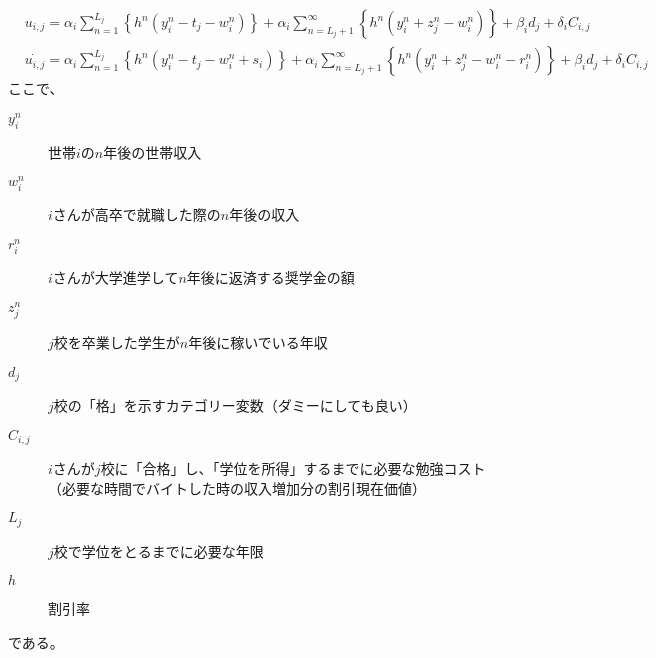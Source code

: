 \documentclass{jsarticle}
\begin{document}
	\begin{align}
		&u_{i, j} = \alpha_i \sum_{n = 1}^{L_j} \left\{ h^n (y_i^n - t_j - w_i^n) \right\} + \alpha_i \sum_{n = L_j + 1}^{\infty} \left\{ h^n (y_i^n + z_j^n - w_i^n) \right\} + \beta_i d_j + \delta_i C_{i, j} \\
		&\dot{u_{i, j}} = \alpha_i \sum_{n = 1}^{L_j} \left\{ h^n (y_i^n - t_j - w_i^n + s_i) \right\} + \alpha_i \sum_{n = L_j + 1}^{\infty} \left\{ h^n (y_i^n + z_j^n - w_i^n - r_i^n) \right\} + \beta_i d_j + \delta_i C_{i, j} 
	\end{align}
	ここで、
	\begin{description}
		\item[$y_i^n$] 世帯$i$の$n$年後の世帯収入
		\item[$w_i^n$] $i$さんが高卒で就職した際の$n$年後の収入
		\item[$r_i^n$] $i$さんが大学進学して$n$年後に返済する奨学金の額
		\item[$z_j^n$] $j$校を卒業した学生が$n$年後に稼いでいる年収
		\item[$d_j$] $j$校の「格」を示すカテゴリー変数（ダミーにしても良い）
		\item[$C_{i, j}$] $i$さんが$j$校に「合格」し、「学位を所得」するまでに必要な勉強コスト（必要な時間でバイトした時の収入増加分の割引現在価値）
		\item[$L_j$] $j$校で学位をとるまでに必要な年限
		\item[$h$] 割引率
	\end{description}
	である。
\end{document}

